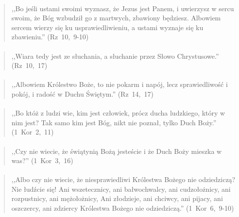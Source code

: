 \documentclass[10pt,a4paper,oneside]{article}
\begin{document}
\paragraph{}
\begin{quote}
,,Bo jeśli ustami swoimi wyznasz, że Jezus jest Panem, i uwierzysz w sercu swoim, że Bóg wzbudził go z martwych, zbawiony będziesz. Albowiem sercem wierzy się ku usprawiedliwieniu, a ustami wyznaje się ku zbawieniu.'' \mbox{(Rz 10, 9-10)}
\end{quote}
\paragraph{}
\begin{quote}
,,Wiara tedy jest ze słuchania, a słuchanie przez Słowo Chrystusowe.'' \mbox{(Rz 10, 17)}
\end{quote}
\paragraph{}
\begin{quote}
,,Albowiem Królestwo Boże, to nie pokarm i napój, lecz sprawiedliwość i pokój, i radość w Duchu Świętym.'' \mbox{(Rz 14, 17)}
\end{quote}
\paragraph{}
\begin{quote}
,,Bo któż z ludzi wie, kim jest człowiek, prócz ducha ludzkiego, który w nim jest? Tak samo kim jest Bóg, nikt nie poznał, tylko Duch Boży.'' \mbox{(1 Kor 2, 11)}
\end{quote}
\paragraph{}
\begin{quote}
,,Czy nie wiecie, że świątynią Bożą jesteście i że Duch Boży mieszka w was?'' \mbox{(1 Kor 3, 16)}
\end{quote}
\paragraph{}
\begin{quote}
,,Albo czy nie wiecie, że niesprawiedliwi Królestwa Bożego nie odziedziczą? Nie łudźcie się! Ani wszetecznicy, ani bałwochwalcy, ani cudzołożnicy, ani rozpustnicy, ani mężołożnicy, Ani złodzieje, ani chciwcy, ani pijacy, ani oszczercy, ani zdziercy Królestwa Bożego nie odziedziczą.'' \mbox{(1 Kor 6, 9-10)}
\end{quote}
\end{document}

